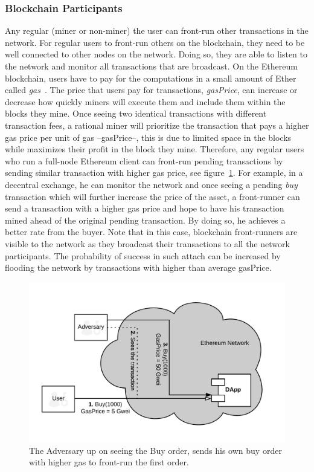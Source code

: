 \subsubsection{Blockchain Participants}
Any regular (miner or non-miner) the user can front-run other transactions in the network. For regular users to front-run others on the blockchain, they need to be well connected to other nodes on the network. Doing so, they are able to listen to the network and monitor all transactions that are broadcast. On the Ethereum blockchain, users have to pay for the computations in a small amount of Ether called \textit{gas}~\cite{AccountT67:online}. The price that users pay for transactions, \textit{gasPrice}, can increase or decrease how quickly miners will execute them and include them within the blocks they mine. Once seeing two identical transactions with different transaction fees, a rational miner will prioritize the transaction that pays a higher gas price per unit of gas --gasPrice--, this is due to limited space in the blocks while maximizes their profit in the block they mine. Therefore, any regular users who run a full-node Ethereum client can front-run pending transactions by sending similar transaction with higher gas price, see figure~\ref{fig:RegularFrontrunning}. For example, in a decentral exchange, he can monitor the network and once seeing a pending \textit{buy} transaction which will further increase the price of the asset, a front-runner can send a transaction with a higher gas price and hope to have his transaction mined ahead of the original pending transaction. By doing so, he achieves a better rate from the buyer. Note that in this case, blockchain front-runners are visible to the network as they broadcast their transactions to all the network participants. The probability of success in such attach can be increased by flooding the network by transactions with higher than average gasPrice.

\begin{figure}[h]
\centering
\includegraphics[width=0.7\linewidth]{figures/Regular_frontrunning.png}
\caption{The Adversary up on seeing the Buy order, sends his own buy order with higher gas to front-run the first order. \label{fig:RegularFrontrunning}} 
\end{figure}


